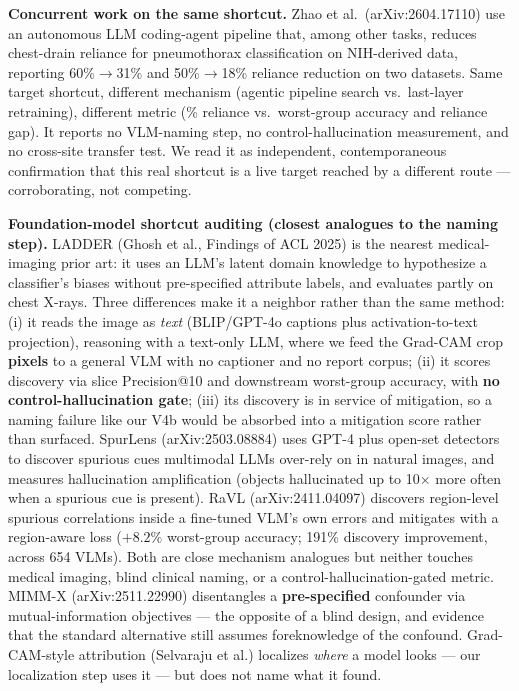 \documentclass{ieeeaccess}
\newcommand{\arw}{$\rightarrow$\allowbreak}
\begin{document}
\textbf{Concurrent work on the same shortcut.} Zhao et al.\ (arXiv:2604.17110) \cite{zhao2026} use an autonomous LLM coding-agent pipeline that, among other tasks, reduces chest-drain reliance for pneumothorax classification on NIH-derived data, reporting 60\%\arw{}31\% and 50\%\arw{}18\% reliance reduction on two datasets. Same target shortcut, different mechanism (agentic pipeline search vs.\ last-layer retraining), different metric (\% reliance vs.\ worst-group accuracy and reliance gap). It reports no VLM-naming step, no control-hallucination measurement, and no cross-site transfer test. We read it as independent, contemporaneous confirmation that this real shortcut is a live target reached by a different route --- corroborating, not competing.

\textbf{Foundation-model shortcut auditing (closest analogues to the naming step).} LADDER (Ghosh et al., Findings of ACL 2025) \cite{ladder} is the nearest medical-imaging prior art: it uses an LLM's latent domain knowledge to hypothesize a classifier's biases without pre-specified attribute labels, and evaluates partly on chest X-rays. Three differences make it a neighbor rather than the same method: (i) it reads the image as \emph{text} (BLIP/GPT-4o captions plus activation-to-text projection), reasoning with a text-only LLM, where we feed the Grad-CAM crop \textbf{pixels} to a general VLM with no captioner and no report corpus; (ii) it scores discovery via slice Precision@10 and downstream worst-group accuracy, with \textbf{no control-hallucination gate}; (iii) its discovery is in service of mitigation, so a naming failure like our V4b would be absorbed into a mitigation score rather than surfaced. SpurLens (arXiv:2503.08884) \cite{spurlens} uses GPT-4 plus open-set detectors to discover spurious cues multimodal LLMs over-rely on in natural images, and measures hallucination amplification (objects hallucinated up to 10$\times$ more often when a spurious cue is present). RaVL (arXiv:2411.04097) \cite{ravl} discovers region-level spurious correlations inside a fine-tuned VLM's own errors and mitigates with a region-aware loss ($+8.2\%$ worst-group accuracy; 191\% discovery improvement, across 654 VLMs). Both are close mechanism analogues but neither touches medical imaging, blind clinical naming, or a control-hallucination-gated metric. MIMM-X (arXiv:2511.22990) \cite{mimmx} disentangles a \textbf{pre-specified} confounder via mutual-information objectives --- the opposite of a blind design, and evidence that the standard alternative still assumes foreknowledge of the confound. Grad-CAM-style attribution (Selvaraju et al.) \cite{gradcam} localizes \emph{where} a model looks --- our localization step uses it --- but does not name what it found.
\end{document}
